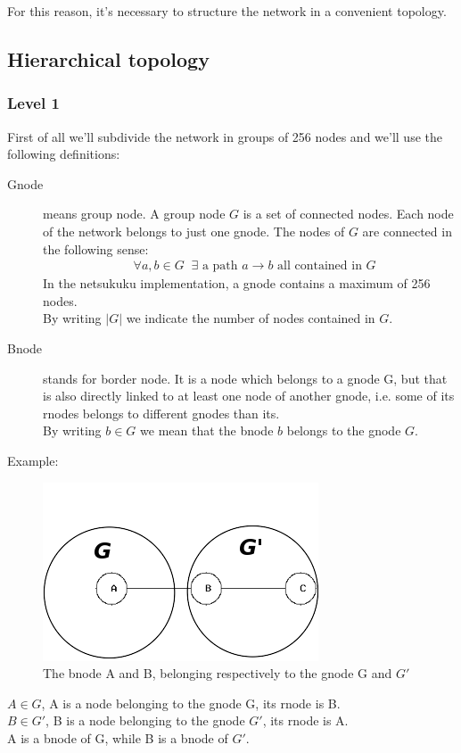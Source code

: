 \documentclass[a4paper]{article}
\newcommand{\T}[1]{\textrm{#1}}
\newcommand{\eal}[1]{{\begin{align*} #1 \end{align*}}}
\begin{document}
For this reason, it's necessary to structure the network in a convenient
topology.

\subsection{Hierarchical topology}
\label{sec:fractal_topology}
\subsubsection{Level 1}
First of all we'll subdivide the network in groups of 256 nodes and we'll use
the following definitions:
\label{gnodedef}
\begin{description}
	\item[Gnode] means group node. A group node $G$ is a set of connected
		nodes. Each node of the network belongs to just one gnode. The
		nodes of $G$ are connected in the following sense:
		\eal{&\forall a,b\in G\;\;\exists \T{ a path $a\rightarrow b$ all contained in $G$}}
		In the netsukuku implementation, a gnode contains a maximum of
		256 nodes.\\
		By writing $|G|$ we indicate the number of nodes contained in
		$G$.
	\item[Bnode] stands for border node. It is a node which belongs to a
		gnode G, but that is also directly linked to at least one node
		of another gnode, i.e. some of its rnodes belongs to different
		gnodes than its.\\
		By writing $b \in G$ we mean that the bnode $b$ belongs to the
		gnode $G$.
\end{description}

Example:\\
\begin{figure}[h]
	\begin{center}
		\includegraphics[scale=0.5]{fig/bnode}
	\end{center}
	\caption{The bnode A and B, belonging respectively to the gnode G and
	$G'$}
\end{figure}
$A \in G $, A is a node belonging to the gnode G, its rnode is B.\\
$B \in G'$, B is a node belonging to the gnode $G'$, its rnode is A.\\
A is a bnode of G, while B is a bnode of $G'$.
\end{document}
